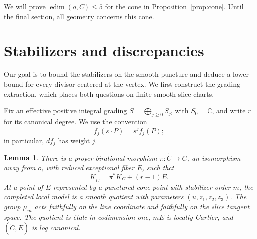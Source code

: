 \documentclass[11pt]{article}
\newtheorem{lemma}[theorem]{Lemma}
\theoremstyle{definition}
\theoremstyle{remark}
\numberwithin{equation}{section}
\newcommand{\C}{\mathbb C}
\newcommand{\edim}{\operatorname{edim}}
\begin{document}
We will prove \(\edim(o,C)\le5\) for the cone in Proposition~\ref{prop:cone}. Until the final section, all geometry concerns this cone.

\section{Stabilizers and discrepancies}\label{sec:stabilizers}

Our goal is to bound the stabilizers on the smooth puncture and deduce a lower bound for every divisor centered at the vertex. We first construct the grading extraction, which places both questions on finite smooth slice charts.

Fix an effective positive integral grading \(S=\bigoplus_{j\ge0}S_j\), with \(S_0=\C\), and write \(r\) for its canonical degree. We use the convention
\[
f_j(s\cdot P)=s^j f_j(P);
\]
in particular, \(df_j\) has weight \(j\).

\begin{lemma}\label{lem:extraction}
There is a proper birational morphism \(\pi:\widetilde C\to C\), an isomorphism away from \(o\), with reduced exceptional fiber \(E\), such that
\[
K_{\widetilde C}=\pi^*K_C+(r-1)E.
\]
At a point of \(E\) represented by a punctured-cone point with stabilizer order \(m\), the completed local model is a smooth quotient with parameters \((u,z_1,z_2,z_3)\). The group \(\mu_m\) acts faithfully on the line coordinate and faithfully on the slice tangent space. The quotient is étale in codimension one, \(mE\) is locally Cartier, and \((\widetilde C,E)\) is log canonical.
\end{lemma}
\end{document}
